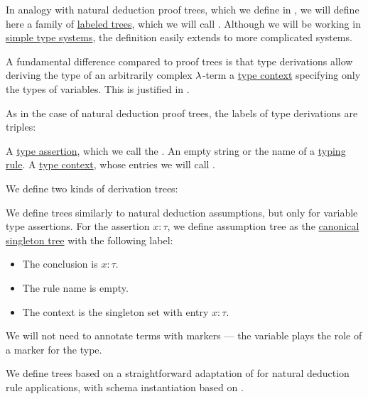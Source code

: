 \begin{definition}\label{def:type_derivation_tree}\mimprovised
  In analogy with natural deduction proof trees, which we define in , we will define here a family of \hyperref[def:labeled_tree]{labeled trees}, which we will call . Although we will be working in \hyperref[def:simple_type_system]{simple type systems}, the definition easily extends to more complicated systems.

  A fundamental difference compared to proof trees is that type derivations allow deriving the type of an arbitrarily complex \( \mathrm{\lambda} \)-term a \hyperref[def:type_context]{type context} specifying only the types of variables. This is justified in .

  As in the case of natural deduction proof trees, the labels of type derivations are triples:
  \begin{thmenum}[series=def:type_derivation_tree]
     A \hyperref[def:type_assertion]{type assertion}, which we call the .
     An empty string or the name of a \hyperref[def:simple_typing_rule]{typing rule}.
     A \hyperref[def:type_context]{type context}, whose entries we will call .
  \end{thmenum}

  We define two kinds of derivation trees:
  \begin{thmenum}[resume=def:type_derivation_tree]
     We define  trees similarly to natural deduction assumptions, but only for variable type assertions. For the assertion \( x: \tau \), we define assumption tree as the \hyperref[def:canonical_singleton_tree]{canonical singleton tree} with the following label:
    \begin{itemize}
      \item The conclusion is \( x: \tau \).
      \item The rule name is empty.
      \item The context is the singleton set with entry \( x: \tau \).
    \end{itemize}

    We will not need to annotate terms with markers --- the variable plays the role of a marker for the type.

     We define  trees based on a straightforward adaptation of  for natural deduction rule applications, with schema instantiation based on .


\end{thmenum}
\end{definition}
